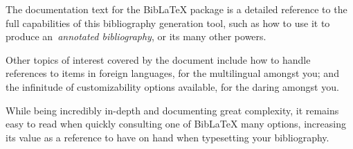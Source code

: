 The documentation text for the Bib\LaTeX{} package is a detailed reference to
the full capabilities of this bibliography generation tool, such as how to use
it to produce an~\emph{annotated bibliography}, or its many other powers.

Other topics of interest covered by the document include how to handle
references to items in foreign languages, for the multilingual amongst you; and
the infinitude of customizability options available, for the daring amongst you.

While being incredibly in-depth and documenting great complexity, it remains
easy to read when quickly consulting one of Bib\LaTeX{} many options, increasing
its value as a reference to have on hand when typesetting your bibliography.
